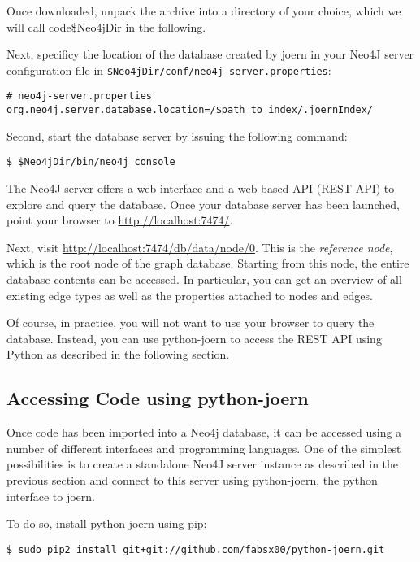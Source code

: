 \documentclass[a4paper]{article}
\newcommand{\code}[1]{\texttt{\small #1}}
\begin{document}
Once downloaded, unpack the archive into a directory of your choice,
which we will call code{\$Neo4jDir} in the following.

Next, specificy the location of the database created by joern in your
Neo4J server configuration file in
\code{\$Neo4jDir/conf/neo4j-server.properties}:

\begin{verbatim}
# neo4j-server.properties
org.neo4j.server.database.location=/$path_to_index/.joernIndex/
\end{verbatim}

Second, start the database server by issuing the following command:

\begin{verbatim}
$ $Neo4jDir/bin/neo4j console
\end{verbatim}
	
The Neo4J server offers a web interface and a web-based API (REST API)
to explore and query the database. Once your database server has been
launched, point your browser to
\href{http://localhost:7474/}{http://localhost:7474/}. 

Next, visit
\href{http://localhost:7474/db/data/node/0}{http://localhost:7474/db/data/node/0}. This
is the \emph{reference node}, which is the root node of the graph
database. Starting from this node, the entire database contents can be
accessed. In particular, you can get an overview of all existing edge
types as well as the properties attached to nodes and edges.

Of course, in practice, you will not want to use your browser to query
the database. Instead, you can use python-joern to access the REST
API using Python as described in the following section.

\subsection{Accessing Code using python-joern}

Once code has been imported into a Neo4j database, it can be accessed
using a number of different interfaces and programming languages. One
of the simplest possibilities is to create a standalone Neo4J server
instance as described in the previous section and connect to this
server using python-joern, the python interface to joern.

To do so, install python-joern using pip:

\begin{verbatim}
$ sudo pip2 install git+git://github.com/fabsx00/python-joern.git
\end{verbatim}
\end{document}
